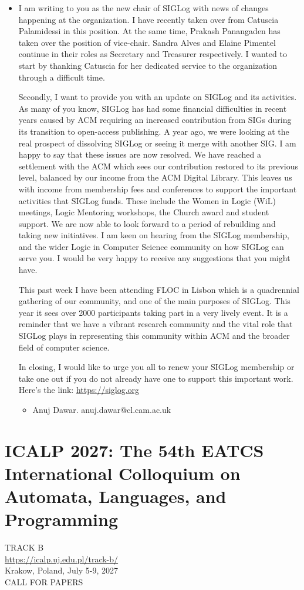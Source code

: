 \documentclass[prodmode,acmtecs]{acmsmall} %
\begin{document}
\begin{itemize}\item  I am writing to you as the new chair of SIGLog with news of changes happening at the organization.  I have recently taken over from Catuscia Palamidessi in this position.  At the same time, Prakash Panangaden has taken over the position of vice-chair.  Sandra Alves and Elaine Pimentel continue in their roles as Secretary and Treasurer respectively.  I wanted to start by thanking Catuscia for her dedicated service to the organization through a difficult time. 
 
  Secondly, I want to provide you with an update on SIGLog and its activities. As many of you know, SIGLog has had some financial difficulties in recent years caused by ACM requiring an increased contribution from SIGs during its transition to open-access publishing. A year ago, we were looking at the real prospect of dissolving SIGLog or seeing it merge with another SIG. I am happy to say that these issues are now resolved. We have reached a settlement with the ACM which sees our contribution restored to its previous level, balanced by our income from the ACM Digital Library. This leaves us with income from membership fees and conferences to support the important activities that SIGLog funds. These include the Women in Logic (WiL) meetings, Logic Mentoring workshops, the Church award and student support. We are now able to look forward to a period of rebuilding and taking new initiatives. I am keen on hearing from the SIGLog membership, and the wider Logic in Computer Science community on how SIGLog can serve you. I would be very happy to receive any suggestions that you might have. 
 
  This past week I have been attending FLOC in Lisbon which is a quadrennial gathering of our community, and one of the main purposes of SIGLog. This year it sees over 2000 participants taking part in a very lively event. It is a reminder that we have a vibrant research community and the vital role that SIGLog plays in representing this community within ACM and the broader field of computer science. 
 
  In closing, I would like to urge you all to renew your SIGLog membership or take one out if you do not already have one to support this important work. Here's the link: \href{https://siglog.org}{https://siglog.org} 
 
\begin{itemize}\item  Anuj Dawar. anuj.dawar@cl.cam.ac.uk
\end{itemize} 
\end{itemize}\section{ICALP 2027: The 54th EATCS International Colloquium on Automata, Languages, and Programming}\label{ICALP2027}  TRACK B\\ 
  \href{https://icalp.uj.edu.pl/track-b/}{https://icalp.uj.edu.pl/track-b/}\\ 
  Krakow, Poland, July 5-9, 2027\\ 
CALL FOR PAPERS 
\end{document}
